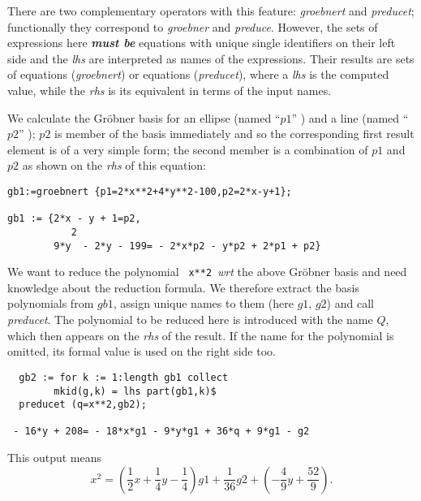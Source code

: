  
\hypertarget{operator:GROEBNERT}{}
\hypertarget{operator:PREDUCET}{}
There are two complementary operators with this feature: \emph{groebnert}
and \emph{preducet}; functionally they correspond to \emph{groebner} and \emph{preduce}.
However, the sets of expressions here {\it {\bf must be}} equations
with unique single identifiers on their left side and the {\it lhs} are
interpreted as names of the expressions. Their results are
sets of equations (\emph{groebnert}) or equations (\emph{preducet}), where
a {\it lhs} is the computed value, while the {\it rhs} is its equivalent
in terms of the input names.

\example {}

We calculate the Gr\"obner basis for an ellipse (named ``$p1$'' ) and a
line (named ``$p2$'' ); $p2$ is member of the basis immediately and so
the corresponding first result element is of a very simple form; the
second member is a combination of $p1$ and $p2$ as shown on the
{\it rhs} of this equation:

\begin{verbatim}
gb1:=groebnert {p1=2*x**2+4*y**2-100,p2=2*x-y+1};

gb1 := {2*x - y + 1=p2,
           2
        9*y  - 2*y - 199= - 2*x*p2 - y*p2 + 2*p1 + p2}
\end{verbatim}

\example {}

We want to reduce the polynomial \verb+ x**2+\ {\it wrt}
the above Gr\"obner basis and need knowledge about the reduction
formula. We therefore extract the basis polynomials from $gb1$,
assign unique names to them (here $g1$, $g2$) and call \emph{preducet}.
The polynomial to be reduced here is introduced with the name $Q$,
which then appears on the {\it rhs} of the result. If the name for the
polynomial is omitted, its formal value is used on the right side too.

\begin{verbatim}
  gb2 := for k := 1:length gb1 collect
        mkid(g,k) = lhs part(gb1,k)$
  preducet (q=x**2,gb2);

 - 16*y + 208= - 18*x*g1 - 9*y*g1 + 36*q + 9*g1 - g2
\end{verbatim}

This output means
\[
x^2 = (\frac{1}{2} x + \frac{1}{4} y - \frac{1}{4}) g1
 + \frac{1}{36} g2 + (-\frac{4}{9} y + \frac{52}{9}).
\]


\example {}

